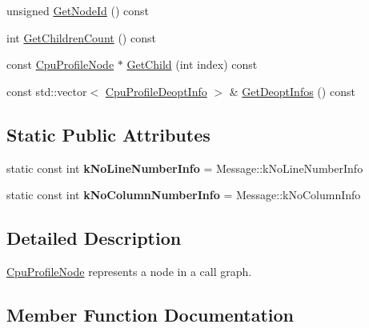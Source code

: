 \begin{DoxyCompactItemize}
\item 
unsigned \mbox{\hyperlink{classv8_1_1CpuProfileNode_a67334450071a60ec3c3cfa58777cc006}{Get\+Node\+Id}} () const
\item 
int \mbox{\hyperlink{classv8_1_1CpuProfileNode_afc0f772f6dad49b670c7b9675d27c688}{Get\+Children\+Count}} () const
\item 
const \mbox{\hyperlink{classv8_1_1CpuProfileNode}{Cpu\+Profile\+Node}} $\ast$ \mbox{\hyperlink{classv8_1_1CpuProfileNode_a9432760b2ab86fe7536b7f7b264ff0ae}{Get\+Child}} (int index) const
\item 
const std\+::vector$<$ \mbox{\hyperlink{structv8_1_1CpuProfileDeoptInfo}{Cpu\+Profile\+Deopt\+Info}} $>$ \& \mbox{\hyperlink{classv8_1_1CpuProfileNode_ade83e1a3fef2404d0d2d1289aad4ddd9}{Get\+Deopt\+Infos}} () const
\end{DoxyCompactItemize}
\subsection*{Static Public Attributes}
\begin{DoxyCompactItemize}
\item 
\mbox{\label{classv8_1_1CpuProfileNode_ad54213fe8a795cb6669566f0272fc5ba}} 
static const int {\bfseries k\+No\+Line\+Number\+Info} = Message\+::k\+No\+Line\+Number\+Info
\item 
\mbox{\label{classv8_1_1CpuProfileNode_a7c8c1dea3ae0cf4c219b7b1f15a8405b}} 
static const int {\bfseries k\+No\+Column\+Number\+Info} = Message\+::k\+No\+Column\+Info
\end{DoxyCompactItemize}


\subsection{Detailed Description}
\mbox{\hyperlink{classv8_1_1CpuProfileNode}{Cpu\+Profile\+Node}} represents a node in a call graph. 

\subsection{Member Function Documentation}
\mbox{\label{classv8_1_1CpuProfileNode_a4c811a611ba68f0484ad3eb560898889}} 
